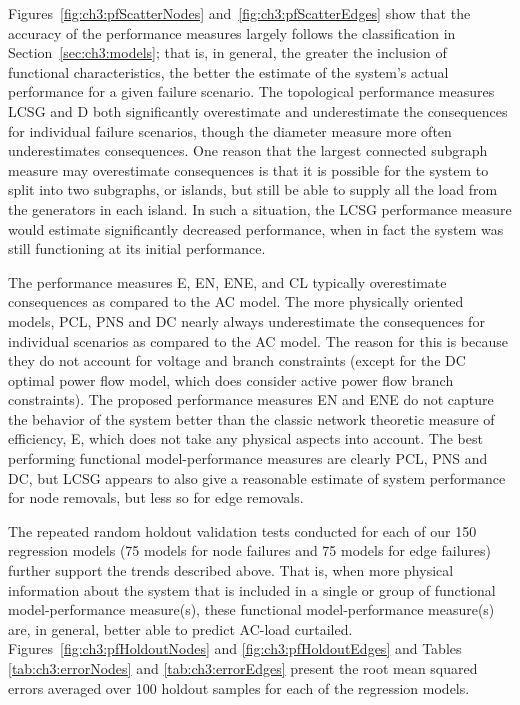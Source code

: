 

Figures~\ref{fig:ch3:pfScatterNodes} and~\ref{fig:ch3:pfScatterEdges} show that the accuracy of the performance measures largely follows the classification in Section~\ref{sec:ch3:models}; that is, in general, the greater the inclusion of functional characteristics, the better the estimate of the system's actual performance for a given failure scenario. The topological performance measures LCSG and D both significantly overestimate and underestimate the consequences for individual failure scenarios, though the diameter measure more often underestimates consequences. One reason that the largest connected subgraph measure may overestimate consequences is that it is possible for the system to split into two subgraphs, or islands, but still be able to supply all the load from the generators in each island. In such a situation, the LCSG performance measure would estimate significantly decreased performance, when in fact the system was still functioning at its initial performance. 

The performance measures E, EN, ENE, and CL typically overestimate consequences as compared to the AC model. The more physically oriented models, PCL, PNS and DC nearly always underestimate the consequences for individual scenarios as compared to the AC model. The reason for this is because they do not account for voltage and branch constraints (except for the DC optimal power flow model, which does consider active power flow branch constraints). The proposed performance measures EN and ENE do not capture the behavior of the system better than the classic network theoretic measure of efficiency, E, which does not take any physical aspects into account. The best performing functional model-performance measures are clearly PCL, PNS and DC, but LCSG appears to also give a reasonable estimate of system performance for node removals, but less so for edge removals.

The repeated random holdout validation tests conducted for each of our 150 regression models (75 models for node failures and 75 models for edge failures) further support the trends described above.  That is, when more physical information about the system that is included in a single or group of functional model-performance measure(s), these functional model-performance measure(s) are, in general, better able to predict AC-load curtailed. Figures~\ref{fig:ch3:pfHoldoutNodes} and \ref{fig:ch3:pfHoldoutEdges} and Tables \ref{tab:ch3:errorNodes} and \ref{tab:ch3:errorEdges} present the root mean squared errors averaged over 100 holdout samples for each of the regression models.


